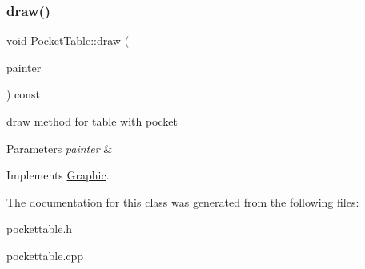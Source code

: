 \subsubsection{\texorpdfstring{draw()}{draw()}}
{\footnotesize\ttfamily void Pocket\+Table\+::draw (\begin{DoxyParamCaption}\item[{Q\+Painter \&}]{painter }\end{DoxyParamCaption}) const\hspace{0.3cm}{\ttfamily [virtual]}}



draw method for table with pocket 


\begin{DoxyParams}{Parameters}
{\em painter} & \\
\hline
\end{DoxyParams}


Implements \mbox{\hyperlink{class_graphic_aed0af75ae3756baeb3fe663ae5f36f29}{Graphic}}.



The documentation for this class was generated from the following files\+:\begin{DoxyCompactItemize}
\item 
pockettable.\+h\item 
pockettable.\+cpp\end{DoxyCompactItemize}
